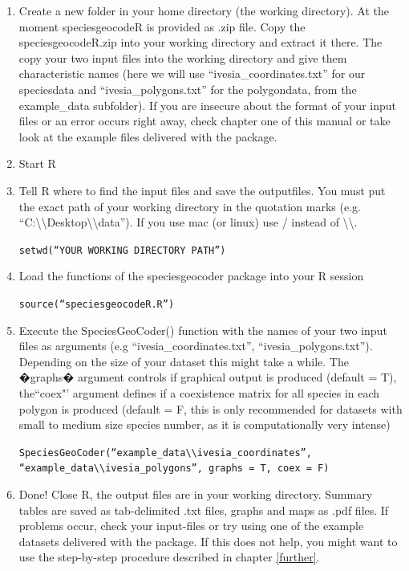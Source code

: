 \documentclass[a4paper,titlepage,11pt]{scrreprt}
\begin{document}
\begin{enumerate}

\item  Create a new folder in your home directory (the working directory). At the moment speciesgeocodeR is provided as .zip file. Copy the speciesgeocodeR.zip into your working directory and extract it there. The copy your two input files into the working directory and give them characteristic names (here we will use ``ivesia\_coordinates.txt'' for our speciesdata and ``ivesia\_polygons.txt'' for the polygondata, from the example\_data subfolder). If you are insecure about the format of your input files or an error occurs right away, check chapter one of this manual or take look at the example files delivered with the package.

\item Start R

\item Tell R where to find the input files and save the outputfiles. You must put the exact path of your working directory in the quotation marks (e.g. ``C:\textbackslash \textbackslash Desktop\textbackslash \textbackslash data''). If you use mac (or linux) use / instead of \textbackslash \textbackslash.

\texttt{setwd(``YOUR WORKING DIRECTORY PATH'')}

\item Load the functions of the speciesgeocoder package into your R session 

\texttt{source(``speciesgeocodeR.R'')}

\item{Execute the SpeciesGeoCoder() function with the names of your two input files as arguments (e.g ``ivesia\_coordinates.txt'', ``ivesia\_polygons.txt''). Depending on the size of your dataset this might take a while. The �graphs� argument controls if graphical output is produced (default = T), the``coex"' argument defines if a coexistence matrix for all species in each polygon is produced (default = F, this is only recommended for datasets with small to medium size species number, as it is computationally very intense)}

\texttt{SpeciesGeoCoder(``example\_data\textbackslash \textbackslash ivesia\_coordinates'', }\\
\texttt{``example\_data\textbackslash \textbackslash ivesia\_polygons'',  graphs = T, coex = F)}

\item{Done! Close R, the output files are in your working directory. Summary tables are saved as tab-delimited .txt files, graphs and maps as .pdf files. If problems occur, check your input-files or try using one of the example datasets delivered with the package. If this does not help, you might want to use the step-by-step procedure described in chapter \ref{further}.}


\end{enumerate}
\end{document}
